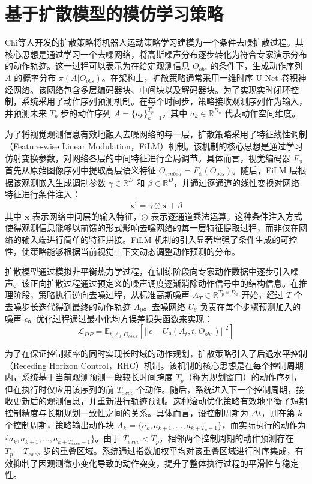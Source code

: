 \section{基于扩散模型的模仿学习策略}
Chi等人开发的扩散策略\cite{chi2025diffusion}将机器人运动策略学习建模为一个条件去噪扩散过程。其核心思想是通过学习一个去噪网络，将高斯噪声分布逐步转化为符合专家演示分布的动作轨迹。这一过程可以表示为在给定观测信息 $O_{obs}$ 的条件下，生成动作序列 $A$ 的概率分布 $\pi(A|O_{obs})$。在架构上，扩散策略通常采用一维时序 U-Net 卷积神经网络。该网络包含多层编码器块、中间块以及解码器块。为了实现实时闭环控制，系统采用了动作序列预测机制。在每个时间步，策略接收观测序列作为输入，并预测未来 $T_{p}$ 步的动作序列 $A=\{a_{k}\}_{k=1}^{T_{p}}$，其中 $a_{k} \in \mathbb{R}^{D_{a}}$ 代表动作空间维度。

为了将视觉观测信息有效地融入去噪网络的每一层，扩散策略采用了特征线性调制（Feature-wise Linear Modulation，FiLM）\cite{perez2018film}机制。该机制的核心思想是通过学习仿射变换参数，对网络各层的中间特征进行全局调节。具体而言，视觉编码器 $F_{\phi}$ 首先从原始图像序列中提取高层语义特征 $O_{embed}=F_{\phi}(O_{obs})$。随后，FiLM 层根据该观测嵌入生成调制参数 $\gamma \in \mathbb{R}^{D}$ 和 $\beta \in \mathbb{R}^{D}$，并通过逐通道的线性变换对网络特征进行条件注入：
\begin{equation}
\mathbf{x}^{\prime} = \gamma \odot \mathbf{x} + \beta
\end{equation}
其中 $\mathbf{x}$ 表示网络中间层的输入特征，$\odot$ 表示逐通道乘法运算。这种条件注入方式使得观测信息能够以前馈的形式影响去噪网络的每一层特征提取过程，而非仅在网络的输入端进行简单的特征拼接。FiLM 机制的引入显著增强了条件生成的可控性，使策略能够根据当前视觉上下文动态调整动作预测的分布。

扩散模型通过模拟非平衡热力学过程，在训练阶段向专家动作数据中逐步引入噪声。该正向扩散过程通过预定义的噪声调度逐渐消除动作信号中的结构信息。在推理阶段，策略执行逆向去噪过程，从标准高斯噪声 $A_{T} \in \mathbb{R}^{T_{p} \times D_{a}}$ 开始，经过 $T$ 个去噪步长迭代得到最终的动作轨迹 $A_{0}$。去噪网络 $U_{\theta}$ 负责在每个步骤预测加入的噪声 $\epsilon$。优化过程通过最小化均方误差损失函数来实现：
\begin{equation}
    \mathcal{L}_{DP}=\mathbb{E}_{t,A_{0},O_{obs,\epsilon}}[||\epsilon-U_{\theta}(A_{t},t,O_{obs})||^{2}]
\end{equation}

为了在保证控制频率的同时实现长时域的动作规划，扩散策略引入了后退水平控制（Receding Horizon Control，RHC）机制。该机制的核心思想是在每个控制周期内，系统基于当前观测预测一段较长时间跨度 $T_{p}$（称为规划窗口）的动作序列，但在执行时仅应用该序列的前 $T_{exec}$ 个动作。随后，系统进入下一个控制周期，接收更新后的观测信息，并重新进行轨迹预测。这种滚动优化策略有效地平衡了短期控制精度与长期规划一致性之间的关系。具体而言，设控制周期为 $\Delta t$，则在第 $k$ 个控制周期，策略输出动作块 $A_{k}=\{a_{k}, a_{k+1}, \ldots, a_{k+T_{p}-1}\}$，而实际执行的动作为 $\{a_{k}, a_{k+1}, \ldots, a_{k+T_{exec}-1}\}$。由于 $T_{exec} < T_{p}$，相邻两个控制周期的动作预测存在 $T_{p}-T_{exec}$ 步的重叠区域。系统通过指数加权平均对该重叠区域进行时序集成，有效抑制了因观测微小变化导致的动作突变，提升了整体执行过程的平滑性与稳定性。

